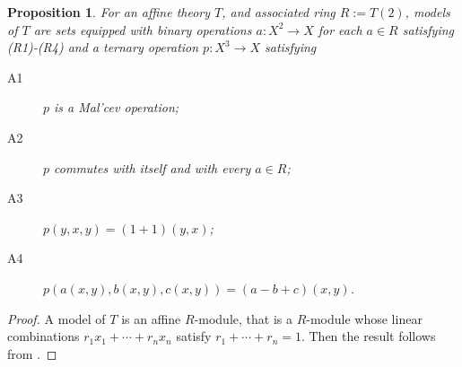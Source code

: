 \documentclass{amsart}
\numberwithin{equation}{section}
\theoremstyle{plain}
\newtheorem{proposition}[theorem]{Proposition}
\theoremstyle{definition}
\begin{document}
\begin{proposition} 
  \label{prop:6.3.4}
  For an affine theory $T$, and associated ring $R:=T(2)$, models of $T$ are sets equipped with binary operations $a: X^2 \to X$ for each $a \in R$ satisfying (R1)-(R4) and a ternary operation $p: X^3 \to X$ satisfying 
\begin{description}
  \item[A1] $p$ is a Mal'cev operation;  
  \item[A2] $p$ commutes with itself and with every $a \in R$; 
  \item[A3] $p(y,x,y)=(1+1)(y,x)$; 
  \item[A4] $p(a(x,y), b(x,y), c(x,y)) = (a-b+c)(x,y)$.    
\end{description}
\end{proposition}
\begin{proof}
  A model of $T$ is an affine $R$-module, that is a $R$-module whose linear combinations $r_1x_1 + \cdots + r_n x_n$ satisfy $r_1 + \cdots + r_n =1$.
  Then the result follows from \cite[Theorem 6.3.4]{RS02}. 
\end{proof}
\end{document}
